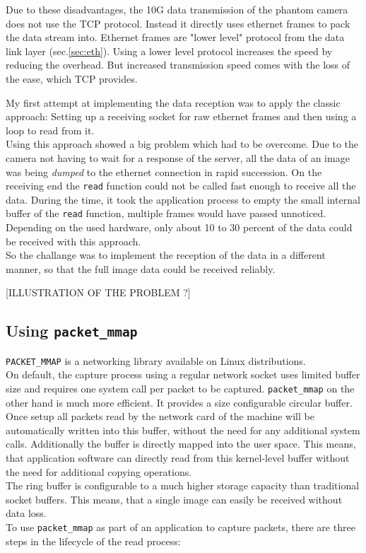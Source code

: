 Due to these disadvantages, the 10G data transmission of the phantom camera does not use the TCP protocol. Instead it directly uses ethernet frames to pack the data stream into. Ethernet frames are "lower level" protocol from the data link layer (sec.\ref{sec:eth}). Using a lower level protocol increases the speed by reducing the overhead. But increased transmission speed comes with the loss of the ease, which TCP provides.\par 

My first attempt at implementing the data reception was to apply the classic approach: Setting up a receiving socket for raw ethernet frames and then using a loop to read from it.\\
Using this approach showed a big problem which had to be overcome. Due to the camera not having to wait for a response of the server, all the data of an image was being \textit{dumped} to the ethernet connection in rapid succession. On the receiving end the \texttt{read} function could not be called fast enough to receive all the data. During the time, it took the application process to empty the small internal buffer of the \texttt{read} function, multiple frames would have passed unnoticed. Depending on the used hardware, only about 10 to 30 percent of the data could be received with this approach.\\
So the challange was to implement the reception of the data in a different manner, so that the full image data could be received reliably.

[ILLUSTRATION OF THE PROBLEM ?]

\subsection{Using \texttt{packet\_mmap}}
\label{sec:mmap}


\texttt{PACKET\_MMAP} is a networking library available on Linux distributions.\\
On default, the capture process using a regular network socket uses limited buffer size and requires one system call per packet to be captured. \texttt{packet\_mmap} on the other hand is much more efficient. It provides a size configurable circular buffer. Once setup all packets read by the network card of the machine will be automatically written into this buffer, without the need for any additional system calls. Additionally the buffer is directly mapped into the user space. This means, that application software can directly read from this kernel-level buffer without the need for additional copying operations.\\
The ring buffer is configurable to a much higher storage capacity than traditional socket buffers. This means, that a single image can easily be received without data loss.\cite{packetmmap}\\
To use \texttt{packet\_mmap} as part of an application to capture packets, there are three steps in the lifecycle of the read process:

